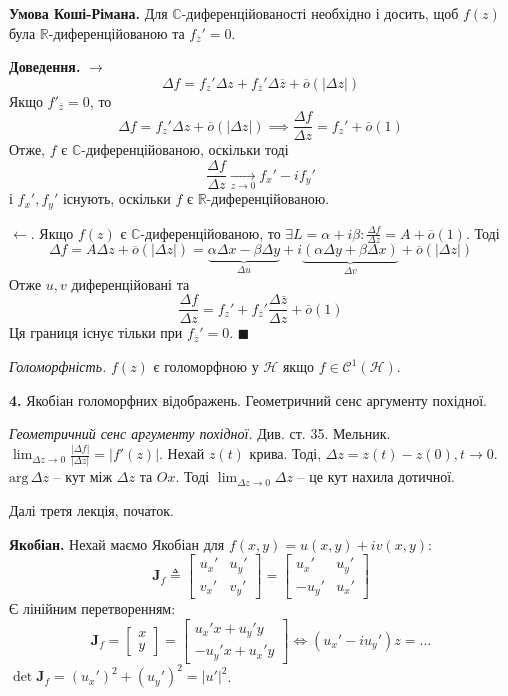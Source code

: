 \documentclass[14pt]{extarticle}
\begin{document}
\textbf{Умова Коші-Рімана.} Для $\mathbb{C}$-диференційованості необхідно і досить, щоб $f(z)$ була $\mathbb{R}$-диференційованою та $f_{\overline{z}}'=0$. 

\textbf{Доведення.} $\to$
\[
\Delta f = f_z'\Delta z + f_{\overline{z}}' \Delta \overline{z} + \overline{o}(|\Delta z|)
\]
Якщо $f'_{\overline{z}}=0$, то
\[
\Delta f = f_z'\Delta z + \overline{o}(|\Delta z|) \implies \frac{\Delta f}{\Delta z} = f_z' + \overline{o}(1)
\]
Отже, $f$ є $\mathbb{C}$-диференційованою, оскільки тоді
\[
\frac{\Delta f}{\Delta z} \xrightarrow[z \to 0]{} f_x' - if_y'
\]
і $f_x',f_y'$ існують, оскільки $f$ є $\mathbb{R}$-диференційованою. 

$\leftarrow$. Якщо $f(z)$ є $\mathbb{C}$-диференційованою, то $\exists L = \alpha+i\beta: \frac{\Delta f}{\Delta z} = A+\overline{o}(1)$. Тоді
\[
\Delta f = A \Delta z + \overline{o}(|\Delta z|) = \underbrace{\alpha \Delta x - \beta\Delta y}_{\Delta u} + i\underbrace{(\alpha \Delta y + \beta \Delta x)}_{\Delta v} + \overline{o}(|\Delta z|)
\]
Отже $u,v$ диференційовані та
\[
\frac{\Delta f}{\Delta z} = f_z' + f_{\overline{z}}' \frac{\Delta \overline{z}}{\Delta z} + \overline{o}(1)
\]
Ця границя існує тільки при $f_{\overline{z}}' = 0$. $\blacksquare$

\textit{Голоморфність.} $f(z)$ є голоморфною у $\mathcal{H}$ якщо $f \in \mathcal{C}^1(\mathcal{H})$. 

\textbf{4.} Якобіан голоморфних відображень. Геометричний сенс аргументу похідної.

\textit{Геометричний сенс аргументу похідної.} Див. ст. 35. Мельник. $\lim_{\Delta z \to 0} \frac{|\Delta f|}{|\Delta z|} = |f'(z)|$. Нехай $z(t)$ крива. Тоді, $\Delta z = z(t)-z(0), t \to 0$. $\text{arg} \, \Delta z$ -- кут між $\Delta z$ та $Ox$. Тоді $\lim_{\Delta z \to 0}\Delta z$ -- це кут нахила дотичної. 

Далі третя лекція, початок.

\textbf{Якобіан.} Нехай маємо Якобіан для $f(x,y)=u(x,y)+iv(x,y)$:
\[
\mathbf{J}_f \triangleq \begin{bmatrix}
    u_x' & u_y' \\ v_x' & v_y'
\end{bmatrix} = \begin{bmatrix}
    u_x' & u_y' \\ -u_y' & u_x'
\end{bmatrix}
\]
Є лінійним перетворенням:
\[
\mathbf{J}_f=\begin{bmatrix}
    x \\ y
\end{bmatrix} = \begin{bmatrix}
    u_x'x + u_y'y \\ -u_y'x + u_x'y
\end{bmatrix} \iff (u_x'-iu_y')z=...
\]
$\det \mathbf{J}_f = (u_x')^2+(u_y')^2=|u'|^2$. 
\end{document}

